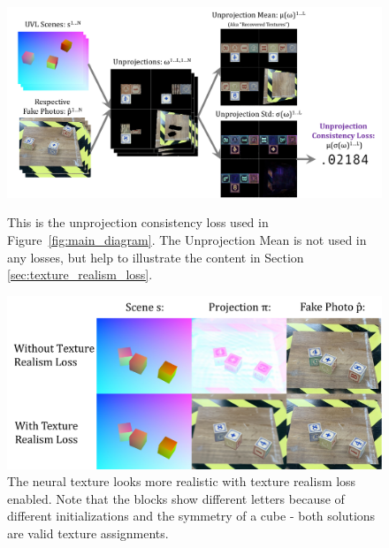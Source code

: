 \documentclass{article}
\begin{document}
\begin{figure}
    \centering
    \begin{minipage}{0.57\textwidth}
		\includegraphics[width=1\linewidth]{../images/unprojection_consistency_loss_without_reprojection.pdf}\label{fig:unprojection_consistency_loss}
		\vspace{-5pt}
	\caption{
		This is the unprojection consistency loss used in Figure~\ref{fig:main_diagram}.
		The Unprojection Mean is not used in any losses, but help to illustrate the content in Section \ref{sec:texture_realism_loss}.
	}
	\end{minipage}
	\hfill
    \begin{minipage}{0.39\textwidth}
        \includegraphics[width=1\linewidth]{../images/texture_realism_ablation.pdf}
            \vspace{-5pt}
			\caption{
				The neural texture looks more realistic with texture realism loss enabled. Note that the blocks show different letters because of different initializations and the symmetry of a cube - both solutions are valid texture assignments. 
			}
			\label{fig:texture_realism_ablation}
    \end{minipage}
    \vspace{-15pt}
\end{figure}
\end{document}
